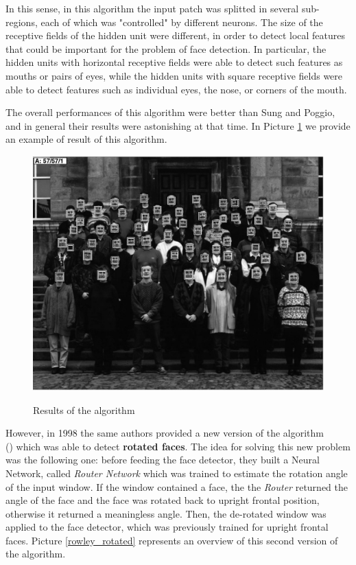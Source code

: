 In this sense, in this algorithm the input patch was splitted in several sub-regions, each of which was "controlled" by different neurons. The size of the receptive fields of the hidden unit were different, in order to detect local features that could be important for the problem of face detection. In particular, the hidden units with horizontal receptive fields were able to detect such features as mouths or pairs of eyes, while the hidden units with square receptive fields were able to detect features such as individual eyes, the nose, or corners of the mouth. 

The overall performances of this algorithm were better than Sung and Poggio, and in general their results were astonishing at that time. In Picture \ref{rowley_results} we provide an example of result of this algorithm.

\begin{figure}[h!]
		\centering
		\includegraphics[scale = 0.6]{img/rowley_results.jpg}
        \label{rowley_results}
        \caption{Results of the algorithm}
\end{figure}

However, in 1998 the same authors provided a new version of the algorithm \\ (\cite{rowley1998rotation}) which was able to detect \textbf{rotated faces}. The idea for solving this new problem was the following one: before feeding the face detector, they built a Neural Network, called \textit{Router Network} which was trained to estimate the rotation angle of the input window. If the window contained a face, the the \textit{Router} returned the angle of the face and the face was rotated back to upright frontal position, otherwise it returned a meaningless angle. Then, the de-rotated window was applied to the face detector, which was previously trained for upright frontal faces. Picture \ref{rowley_rotated} represents an overview of this second version of the algorithm.

